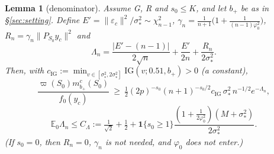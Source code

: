 \documentclass[11pt]{article}
\newtheorem{lemma}[theorem]{Lemma}
\theoremstyle{remark}
\newcommand{\E}{\mathbb E}
\newcommand{\IG}{\mathrm{IG}}
\newcommand{\vp}{\varpi}
\newcommand{\yc}{y_c}
\newcommand{\bp}{b_+}
\newcommand{\eps}{\varepsilon}
\begin{document}
\begin{lemma}[denominator]\label{lem:den}
Assume G, R and $s_0\le K$, and let $\bp$ be as in \S\ref{sec:setting}. Define $E'=\|\eps_c\|^2/\sigma_*^2\sim\chi^2_{n-1}$, $\gamma_n=\frac1{n+1}\big(1+\frac1{(n-1)\varphi_0^2}\big)$, $R_n=\gamma_n\|P_{S_0}\yc\|^2$ and
\[
\Lambda_n=\frac{|E'-(n-1)|}{2\sqrt n}+\frac{E'}{2n}+\frac{R_n}{2\sigma_*^2}.
\]
Then, with $c_{\IG}:=\min_{v\in[\sigma_*^2,2\sigma_*^2]}\IG(v;0.51,\bp)>0$ (a constant),
\[
\frac{\vp(S_0)m^c_{\bp}(S_0)}{f_0(\yc)}\ \ge\ \tfrac12(2p)^{-s_0}(n+1)^{-s_0/2}c_{\IG}\,\sigma_*^2\,n^{-1/2}e^{-\Lambda_n},\]\[
\E_0\Lambda_n\le C_\Lambda:=\tfrac1{\sqrt2}+\tfrac12+\mathbf 1\{s_0\ge1\}\frac{(1+\frac1{2\varphi_0^2})(M+\sigma_*^2)}{2\sigma_*^2}.
\]
(If $s_0=0$, then $R_n=0$, $\gamma_n$ is not needed, and $\varphi_0$ does not enter.)
\end{lemma}
\end{document}
